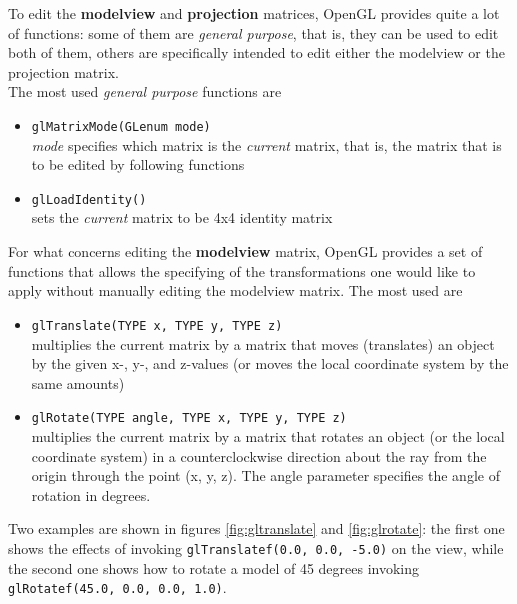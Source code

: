 To edit the \textbf{modelview} and \textbf{projection} matrices, OpenGL 
provides quite a lot of functions: some of them are 
\textit{general purpose}, that is, they can be used to edit both of them, 
others are specifically intended to edit either the modelview or the 
projection matrix.
\\
The most used \textit{general purpose} functions are 

\begin{itemize}
\item \texttt{glMatrixMode(GLenum mode)} \\
  \textit{mode} specifies which matrix is the \textit{current}
  matrix, that is, the matrix that is to be edited by following
  functions
  
\item \texttt{glLoadIdentity()} \\
  sets the \textit{current} matrix to be 4x4 identity matrix
\end{itemize}

For what concerns editing the \textbf{modelview} matrix, OpenGL 
provides a set of functions that allows the specifying of the 
transformations one would like to apply without manually 
editing the modelview matrix. The most used are 

\begin{itemize}
\item \texttt{glTranslate(TYPE x, TYPE y, TYPE z)}\\
  multiplies the current matrix by a matrix that moves 
  (translates) an object by the given x-, y-, and z-values 
  (or moves the local coordinate system by the same amounts)

\item \texttt{glRotate(TYPE angle, TYPE x, TYPE y, TYPE z)} \\
  multiplies the current matrix by a matrix that rotates an 
  object (or the   local coordinate system) in a counterclockwise 
  direction about the ray from the origin through the point 
  (x, y, z). The angle parameter specifies the angle of rotation in degrees.
\end{itemize}

Two examples are shown in figures \ref{fig:gltranslate} and \ref{fig:glrotate}:
the first one shows the effects of invoking \texttt{glTranslatef(0.0, 0.0, -5.0)} 
on the view, while the second one shows how to rotate a model of 45 degrees 
invoking \texttt{glRotatef(45.0, 0.0, 0.0, 1.0)}.

